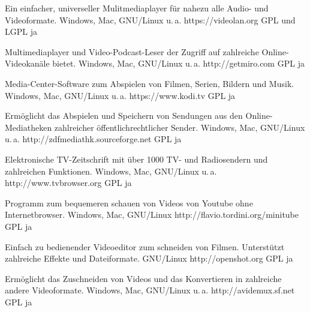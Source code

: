 




{Ein einfacher, universeller Mulitmediaplayer für nahezu alle Audio- und Videoformate.}
{Windows, Mac, GNU/Linux u.\,a.}
{https://videolan.org}
{GPL und LGPL}
{ja}

{Multimediaplayer und Video-Podcast-Leser der Zugriff auf zahlreiche Online-Videokanäle bietet.}
{Windows, Mac, GNU/Linux u.\,a.}
{http://getmiro.com}
{GPL}
{ja}

{Media-Center-Software zum Abspielen von Filmen, Serien, Bildern und Musik.}
{Windows, Mac, GNU/Linux u.\,a.}
{https://www.kodi.tv}
{GPL}
{ja}

{Ermöglicht das Abspielen und Speichern von Sendungen aus den Online-Mediatheken zahlreicher öffentlichrechtlicher Sender.}
{Windows, Mac, GNU/Linux u.\,a.}
{http://zdfmediathk.sourceforge.net}
{GPL}
{ja}


{Elektronische TV-Zeitschrift mit über 1000 TV- und Radiosendern und zahlreichen Funktionen.}
{Windows, Mac, GNU/Linux u.\,a.}
{http://www.tvbrowser.org}
{GPL}
{ja}

{Programm zum bequemeren schauen von Videos von Youtube ohne Internetbrowser.}
{Windows, Mac, GNU/Linux}
{http://flavio.tordini.org/minitube}
{GPL}
{ja}

{Einfach zu bedienender Videoeditor zum schneiden von Filmen. Unterstützt zahlreiche Effekte und Dateiformate.}
{GNU/Linux}
{http://openshot.org}
{GPL}
{ja}

{Ermöglicht das Zuschneiden von Videos und das Konvertieren in zahlreiche andere Videoformate.}
{Windows, Mac, GNU/Linux u.\,a.}
{http://avidemux.sf.net}
{GPL}
{ja}

\backpage

